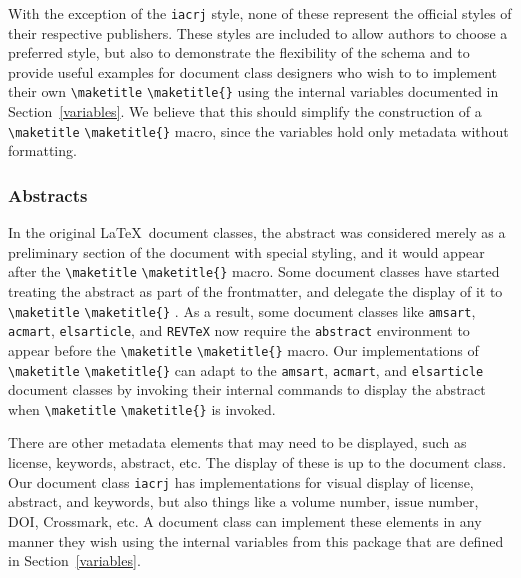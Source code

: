 \documentclass{article}
\newcommand{\cmd}[2][]{%
  \def\FirstArg{#1}%
  \ifx\FirstArg\empty%
    \texttt{\textbackslash{}#2}%
  \else%
    \texttt{\textbackslash{}#2\{#1\}}%
  \fi
}
\begin{document}
With the exception of the \texttt{iacrj} style, none of these
represent the official styles of their respective publishers. These
styles are included to allow authors to choose a preferred style, but
also to demonstrate the flexibility of the schema and
to provide useful examples for document class
designers who wish to to implement their own \cmd{maketitle} using the
internal variables documented in Section~\ref{variables}. We believe
that this should simplify the construction of a \cmd{maketitle} macro,
since the variables hold only metadata without formatting.

\subsubsection{Abstracts}
In the original \LaTeX\ document classes, the abstract was considered
merely as a preliminary section of the document with special
styling, and it would appear after the \cmd{maketitle} macro.  Some document
classes have started treating the abstract as part of the frontmatter,
and delegate the display of it to \cmd{maketitle}. As a result, some document classes like
\texttt{amsart}, \texttt{acmart}, \texttt{elsarticle}, and \texttt{REVTeX}
now require the \texttt{abstract} environment to appear before the
\cmd{maketitle} macro. Our implementations of \cmd{maketitle} can adapt
to the \texttt{amsart}, \texttt{acmart}, and \texttt{elsarticle} document
classes by invoking their internal commands to display the abstract when
\cmd{maketitle} is invoked.

There are other metadata elements that may need to be displayed, such
as license, keywords, abstract, etc.
The display of these is up to the
document class. Our document class \texttt{iacrj}
has implementations for visual display of license, abstract, and keywords,
but also things like a volume number, issue number, DOI, Crossmark, etc.
A document class can implement these elements in any manner they wish
using the internal variables from this package that are 
defined in Section~\ref{variables}.
\end{document}
